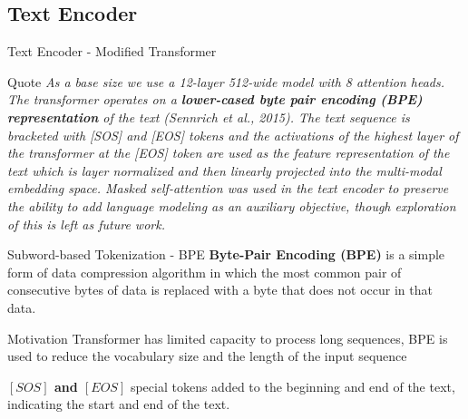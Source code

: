 \documentclass[aspectratio=169,xcolor=dvipsnames]{beamer}
\begin{document}
\subsection{Text Encoder}

\begin{frame}{Text Encoder - Modified Transformer}
    \begin{block}{Quote}
        \textit{As a base size we use a 12-layer 512-wide model with 8 attention heads. The transformer operates on a \textbf{lower-cased byte pair encoding (BPE) representation} of the text (Sennrich et al., 2015). The text sequence is bracketed
        with [SOS] and [EOS] tokens and the activations of the highest layer of the transformer at the [EOS] token are used as the feature representation of the text which is layer normalized and then linearly projected into the multi-modal embedding space. Masked self-attention was used in the text encoder to preserve the ability to add language modeling as an auxiliary objective, though exploration of this is left as
        future work.}
        
    \end{block}
    
    
\end{frame}




\begin{frame}{Subword-based Tokenization - BPE}
    \textbf{Byte-Pair Encoding (BPE)}
    is a simple form of data compression algorithm in which the most common pair of consecutive bytes of data is replaced with a byte that does not occur in that data.
    \medskip
    \begin{block}{Motivation}
        Transformer has limited capacity to process long sequences, BPE is used to reduce the vocabulary size and the length of the input sequence
    \end{block}
    \medskip
    \textbf{$[SOS] $ and $[EOS]$} special tokens added to the beginning and end of the text, indicating the start and end of the text.
    
\end{frame}

\end{document}
